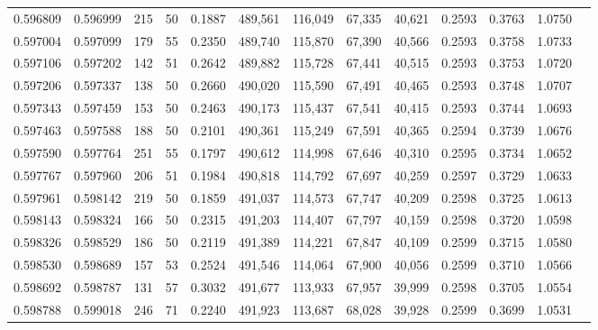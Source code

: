 \begin{tabular}{rrrrrrrrrrrrr}
0.596809 & 0.596999 &   215 &  50 &                                     0.1887 & 489,561 & 116,049 &  67,335 &  40,621 & 0.2593 & 0.3763 & 1.0750 \\
0.597004 & 0.597099 &   179 &  55 &                                     0.2350 & 489,740 & 115,870 &  67,390 &  40,566 & 0.2593 & 0.3758 & 1.0733 \\
0.597106 & 0.597202 &   142 &  51 &                                     0.2642 & 489,882 & 115,728 &  67,441 &  40,515 & 0.2593 & 0.3753 & 1.0720 \\
0.597206 & 0.597337 &   138 &  50 &                                     0.2660 & 490,020 & 115,590 &  67,491 &  40,465 & 0.2593 & 0.3748 & 1.0707 \\
0.597343 & 0.597459 &   153 &  50 &                                     0.2463 & 490,173 & 115,437 &  67,541 &  40,415 & 0.2593 & 0.3744 & 1.0693 \\
0.597463 & 0.597588 &   188 &  50 &                                     0.2101 & 490,361 & 115,249 &  67,591 &  40,365 & 0.2594 & 0.3739 & 1.0676 \\
0.597590 & 0.597764 &   251 &  55 &                                     0.1797 & 490,612 & 114,998 &  67,646 &  40,310 & 0.2595 & 0.3734 & 1.0652 \\
0.597767 & 0.597960 &   206 &  51 &                                     0.1984 & 490,818 & 114,792 &  67,697 &  40,259 & 0.2597 & 0.3729 & 1.0633 \\
0.597961 & 0.598142 &   219 &  50 &                                     0.1859 & 491,037 & 114,573 &  67,747 &  40,209 & 0.2598 & 0.3725 & 1.0613 \\
0.598143 & 0.598324 &   166 &  50 &                                     0.2315 & 491,203 & 114,407 &  67,797 &  40,159 & 0.2598 & 0.3720 & 1.0598 \\
0.598326 & 0.598529 &   186 &  50 &                                     0.2119 & 491,389 & 114,221 &  67,847 &  40,109 & 0.2599 & 0.3715 & 1.0580 \\
0.598530 & 0.598689 &   157 &  53 &                                     0.2524 & 491,546 & 114,064 &  67,900 &  40,056 & 0.2599 & 0.3710 & 1.0566 \\
0.598692 & 0.598787 &   131 &  57 &                                     0.3032 & 491,677 & 113,933 &  67,957 &  39,999 & 0.2598 & 0.3705 & 1.0554 \\
0.598788 & 0.599018 &   246 &  71 &                                     0.2240 & 491,923 & 113,687 &  68,028 &  39,928 & 0.2599 & 0.3699 & 1.0531 \\

\end{tabular}
